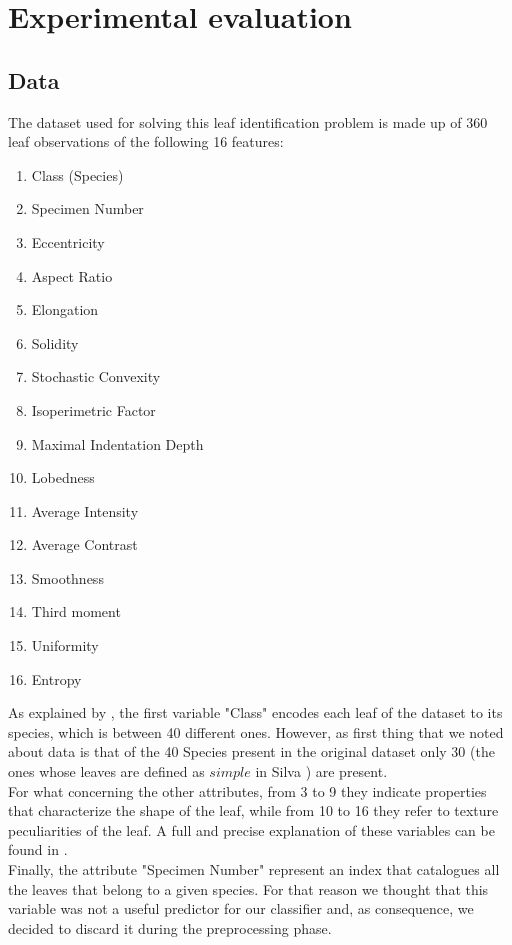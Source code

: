 \documentclass{article}
\begin{document}
\section{Experimental evaluation}

\subsection{Data}
The dataset used for solving this leaf identification problem is made up of 360 leaf observations of the following 16 features:
\begin{multicols}{3}
	\begin{enumerate}
		\item Class (Species)
		\item Specimen Number
		\item Eccentricity
		\item Aspect Ratio
		\item Elongation
		\item Solidity
		\item Stochastic Convexity
		\item Isoperimetric Factor
		\item Maximal Indentation Depth
		\item Lobedness
		\item Average Intensity
		\item Average Contrast
		\item Smoothness
		\item Third moment
		\item Uniformity
		\item Entropy
	\end{enumerate}
\end{multicols}
\noindent As explained by \cite{silva}, the first variable "Class" encodes each leaf of the dataset to its species, which is between 40 different ones. However, as first thing that we noted about data is that of the 40 Species present in the original dataset only 30 (the ones whose leaves are defined as $\textit{simple}$ in Silva \cite{silva}) are present. %
\\For what concerning the other attributes, from 3 to 9 they indicate properties that characterize the shape of the leaf, while from 10 to 16 they refer to texture peculiarities of the leaf. A full and precise explanation of these variables can be found in \cite{silva}.
\\Finally, the attribute "Specimen Number" represent an index that catalogues all the leaves that belong to a given species. For that reason we thought that this variable was not a useful predictor for our classifier and, as consequence, we decided to discard it during the preprocessing phase.
\end{document}
